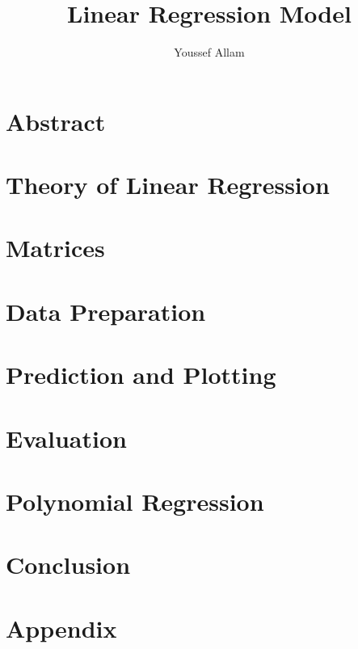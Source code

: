 \documentclass{article}
\begin{document}
    \title{Linear Regression Model}
    \author{Youssef Allam}
    \maketitle

    \tableofcontents

    \newpage
    

    \section{Abstract}
        
    
    \section{Theory of Linear Regression}
        
    
    \section{Matrices}
        
    
    \section{Data Preparation}
        

    \section{Prediction and Plotting}
        

    \section{Evaluation}
        
    \section{Polynomial Regression}
        
    
    \section{Conclusion}
        

    \section{Appendix}
        
\end{document}
